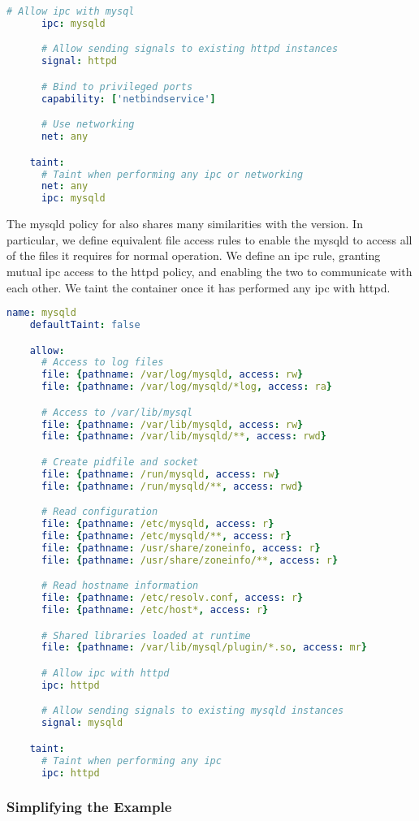 \begin{lstlisting}[language=yaml, gobble=4, float=false, caption={[A \bpfcontain{} policy for Apache httpd]
  A \bpfcontain{} policy for Apache httpd.
  %\todo{Describe this}
}, label={lst:bpfcontain-apache}]
      # Allow ipc with mysql
      ipc: mysqld

      # Allow sending signals to existing httpd instances
      signal: httpd

      # Bind to privileged ports
      capability: ['netbindservice']

      # Use networking
      net: any

    taint:
      # Taint when performing any ipc or networking
      net: any
      ipc: mysqld
\end{lstlisting}

The mysqld policy for \bpfcontain{} also shares many similarities with the \bpfbox{}
version.  In particular, we define equivalent file access rules to enable the mysqld to
access all of the files it requires for normal operation. We define an \gls{ipc} rule,
granting mutual \gls{ipc} access to the httpd policy, and enabling the two to communicate
with each other. We taint the container once it has performed any \gls{ipc} with httpd.

\begin{lstlisting}[language=yaml, gobble=4, float=false, caption={[A \bpfcontain{} policy for MySQL]
  A \bpfcontain{} policy for MySQL.
  %\todo{Describe this}
}, label={lst:bpfcontain-mysql}]
    name: mysqld
    defaultTaint: false

    allow:
      # Access to log files
      file: {pathname: /var/log/mysqld, access: rw}
      file: {pathname: /var/log/mysqld/*log, access: ra}

      # Access to /var/lib/mysql
      file: {pathname: /var/lib/mysqld, access: rw}
      file: {pathname: /var/lib/mysqld/**, access: rwd}

      # Create pidfile and socket
      file: {pathname: /run/mysqld, access: rw}
      file: {pathname: /run/mysqld/**, access: rwd}

      # Read configuration
      file: {pathname: /etc/mysqld, access: r}
      file: {pathname: /etc/mysqld/**, access: r}
      file: {pathname: /usr/share/zoneinfo, access: r}
      file: {pathname: /usr/share/zoneinfo/**, access: r}

      # Read hostname information
      file: {pathname: /etc/resolv.conf, access: r}
      file: {pathname: /etc/host*, access: r}

      # Shared libraries loaded at runtime
      file: {pathname: /var/lib/mysql/plugin/*.so, access: mr}

      # Allow ipc with httpd
      ipc: httpd

      # Allow sending signals to existing mysqld instances
      signal: mysqld

    taint:
      # Taint when performing any ipc
      ipc: httpd
\end{lstlisting}

\subsubsection{Simplifying the \bpfcontain{} Example}

